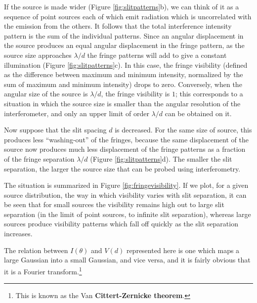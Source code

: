 \documentclass[a4paper,10pt]{article}
\begin{document}
{\noindent}If the source is made wider (Figure \ref{fig:slitpatterns}b), we can think of it as a sequence of point sources each of which emit radiation which is uncorrelated with the emission from the others. It follows that the total interference intensity pattern is the sum of the individual patterns. Since an angular displacement in the source produces an equal angular displacement in the fringe pattern, as the source size approaches $\lambda/d$ the fringe patterns will add to give a constant illumination (Figure \ref{fig:slitpatterns}c). In this case, the fringe visibility (defined as the difference between maximum and minimum intensity, normalized by the sum of maximum and minimum intensity) drops to zero. Conversely, when the angular size of the source is $\lambda/d$, the fringe visibility is $1$; this corresponds to a situation in which the source size is smaller than the angular resolution of the interferometer, and only an upper limit of order $\lambda/d$ can be obtained on it.

{\noindent}Now suppose that the slit spacing $d$ is decreased. For the same size of source, this produces less ``washing-out'' of the fringes, because the same displacement of the source now produces much less displacement of the fringe patterns as a fraction of the fringe separation $\lambda/d$ (Figure \ref{fig:slitpatterns}d). The smaller the slit separation, the larger the source size that can be probed using interferometry.

{\noindent}The situation is summarized in Figure \ref{fig:fringevisibility}. If we plot, for a given source distribution, the way in which visibility varies with slit separation, it can be seen that for small sources the visibility remains high out to large slit separation (in the limit of point sources, to infinite slit separation), whereas large sources produce visibility patterns which fall off quickly as the slit separation increases.

{\noindent}The relation between $I(\theta)$ and $V(d)$ represented here is one which maps a
large Gaussian into a small Gaussian, and vice versa, and it is fairly obvious that it is a Fourier transform.\footnote{This is known as the Van \textbf{Cittert-Zernicke theorem}.}
\end{document}
